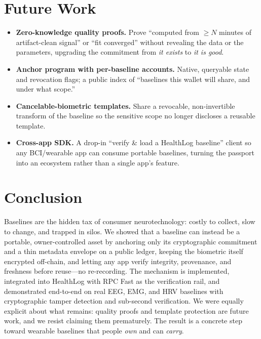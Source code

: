 \documentclass[10pt,twocolumn]{article}
\begin{document}
\section{Future Work}
\label{sec:future}

\begin{itemize}
\item \textbf{Zero-knowledge quality proofs.} Prove ``computed from
  $\ge N$ minutes of artifact-clean signal'' or ``fit converged'' without
  revealing the data or the parameters, upgrading the commitment from
  \emph{it exists} to \emph{it is good}.
\item \textbf{Anchor program with per-baseline accounts.} Native, queryable
  state and revocation flags; a public index of ``baselines this wallet will
  share, and under what scope.''
\item \textbf{Cancelable-biometric templates.} Share a revocable, non-invertible
  transform of the baseline so the sensitive scope no longer discloses a
  reusable template.
\item \textbf{Cross-app SDK.} A drop-in ``verify \& load a HealthLog baseline''
  client so any BCI/wearable app can consume portable baselines, turning the
  passport into an ecosystem rather than a single app's feature.
\end{itemize}

\section{Conclusion}

Baselines are the hidden tax of consumer neurotechnology: costly to collect,
slow to change, and trapped in silos. We showed that a baseline can instead be a
portable, owner-controlled asset by anchoring only its cryptographic commitment
and a thin metadata envelope on a public ledger, keeping the biometric itself
encrypted off-chain, and letting any app verify integrity, provenance, and
freshness before reuse---no re-recording. The mechanism is implemented,
integrated into HealthLog with RPC Fast as the verification rail, and
demonstrated end-to-end on real EEG, EMG, and HRV baselines with cryptographic
tamper detection and sub-second verification. We were equally explicit about what
remains: quality proofs and template protection are future work, and we resist
claiming them prematurely. The result is a concrete step toward wearable
baselines that people \emph{own} and can \emph{carry}.
\end{document}
